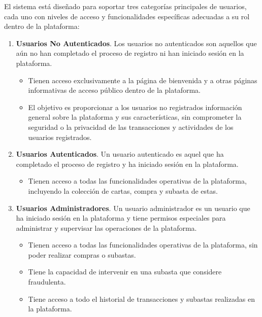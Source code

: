 El sistema está diseñado para soportar tres categorías principales de usuarios, cada uno con niveles de acceso y funcionalidades específicas adecuadas a su rol dentro de la plataforma:
\begin{enumerate}
    \item \textbf{Usuarios No Autenticados}. 
    Los usuarios no autenticados son aquellos que aún no han completado el proceso de registro ni han iniciado sesión en la plataforma. 
    \begin{itemize}
        \item Tienen acceso exclusivamente a la página de bienvenida y a otras páginas informativas de acceso público dentro de la plataforma.
        \item El objetivo es proporcionar a los usuarios no registrados información general sobre la plataforma y sus características, sin comprometer la seguridad o la privacidad de las transacciones y actividades de los usuarios registrados.
   \end{itemize}
    
    \item \textbf{Usuarios Autenticados}.
    Un usuario autenticado es aquel que ha completado el proceso de registro y ha iniciado sesión en la plataforma.
    \begin{itemize}
        \item Tienen acceso a todas las funcionalidades operativas de la plataforma, incluyendo la colección de cartas, compra y subasta de estas.
    \end{itemize}
    
    \item \textbf{Usuarios Administradores}.
    Un usuario administrador es un usuario que ha iniciado sesión en la plataforma y tiene permisos especiales para administrar y supervisar las operaciones de la plataforma.
    \begin{itemize}
        \item Tienen acceso a todas las funcionalidades operativas de la plataforma, sin poder realizar compras o subastas.
        \item Tiene la capacidad de intervenir en una subasta que considere fraudulenta.
        \item Tiene acceso a todo el historial de transacciones y subastas realizadas en la plataforma.
    \end{itemize}
\end{enumerate}
